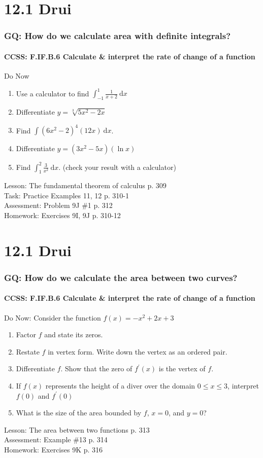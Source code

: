 \documentclass{beamer}
\begin{document}
  \section{12.1 Drui}
  \frame
  {
    \frametitle{GQ: How do we calculate area with definite integrals?}
    \framesubtitle{CCSS: F.IF.B.6 Calculate \& interpret the rate of change of a function}

    \begin{block}{Do Now}
    \begin{enumerate}
        \item Use a calculator to find $\displaystyle \int_{-1}^{1}{\frac{1}{x+2}}\ \mathrm{d}x$
        \item Differentiate $y=\sqrt[3]{5x^2-2x}$
        \item Find $\int{(6x^2-2)^4(12x)} \ \mathrm{d}x$.
        \item Differentiate $y={(3x^2-5x)(\ln x)}$
        \item Find $\displaystyle \int_1^2 \frac{3}{x^2}\ \mathrm{d}x$. (check your result with a calculator)
    \end{enumerate}
    \end{block}
    Lesson: The fundamental theorem of calculus p. 309\\%
    Task: Practice Examples 11, 12 p. 310-1\\%
    Assessment: Problem 9J \#1 p. 312 \\%
    Homework: Exercises 9I, 9J p. 310-12
  }

  \section{12.1 Drui}
  \frame
  {
    \frametitle{GQ: How do we calculate the area between two curves?}
    \framesubtitle{CCSS: F.IF.B.6 Calculate \& interpret the rate of change of a function}

    \begin{block}{Do Now: Consider the function $f(x)=-x^2+2x+3$}
    \begin{enumerate}
        \item Factor $f$ and state its zeros.
        \item Restate $f$ in vertex form. Write down the vertex as an ordered pair.
        \item Differentiate $f$. Show that the zero of $f^\prime(x)$ is the vertex of $f$.
        \item If $f(x)$ represents the height of a diver over the domain $0 \leq x \leq 3$, interpret $f(0)$ and $f^\prime(0)$
        \item What is the size of the area bounded by $f$, $x=0$, and $y=0$?
    \end{enumerate}
    \end{block}
    Lesson: The area between two functions p. 313\\%
    Assessment: Example \#13 p. 314 \\%
    Homework: Exercises 9K p. 316
  }
\end{document}
